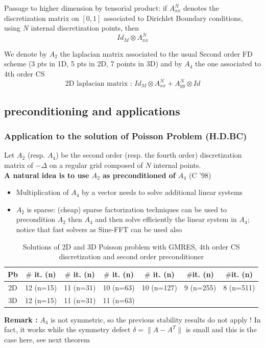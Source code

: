 \documentclass[hyperref={pdfpagemode=FullScreen},9pt]{beamer}
\begin{document}
\begin{frame}
Passage to higher dimension by tensorial product: if $A^N_{xx}$ denotes the discretization matrix on $[0,1]$ associated to Dirichlet Boundary conditions, using $N$ internal discretization points, then 
$$
Id_M\otimes A^N_{xx}
$$

We denote by $A_2$ the laplacian matrix associated to the usual Second order FD scheme (3 pts in 1D, 5 pts in 2D, 7 points in 3D) and by $A_4$ the one associated to 4th order CS
$$
\mbox{2D laplacian matrix : } Id_M\otimes A^N_{xx} + A^N_{yy}\otimes Id
$$
\end{frame}
  \subsection{preconditioning and applications}
 \begin{frame}
 \frametitle{Application to the solution of Poisson Problem  (H.D.BC)}
 Let $A_2$ (resp. $A_4$) be the second order (resp. the fourth order) discretization matrix  of $-\Delta$ on a regular grid composed of $N$ internal points.\\
{\bf A natural idea is to use $A_2$ as preconditioned of $A_4$} (C '98)
\begin{itemize}
\item Multiplication of $A_4$ by a vector needs to solve additional  linear systems
\item $A_2$ is sparse: (cheap) sparse factorization techniques can be used to precondition $A_2$ then $A_4$
and then solve efficiently the linear system in $A_4$;  notice that fast solvers as Sine-FFT can be used also
\end{itemize}
{\small 
\begin{table}[!h]
\begin{center}
\begin{tabular}{|c||c|c|c|c|c|c|}
\hline 
 Pb& $\#$ it. (n) &  $\#$ it. (n) & $\#$ it. (n) & $\#$ it. (n) & $\#$it. (n) & $\#$it. (n)  \\
 \hline
2D & 12 (n=15) &  11  (n=31) &  10 (n=63)  & 10 (n=127) & 9 (n=255) & 8 (n=511)\\
 \hline
 3D & 12 (n=15) &  11  (n=31) &  11 (n=63) & & &\\
\hline 
\end{tabular} 
\caption{Solutions of 2D and 3D Poisson problem with GMRES, 4th order CS discretization and second order preconditioner}
\label{PrecondPoisson}
\end{center}
\end{table}
}
{\bf Remark :} $A_4$ is not symmetric, so the previous stability results do not apply ! 
\pause
In fact, it works while the symmetry defect $\delta = \|A-A^T\|$ is small and this is the case here, see next theorem
 \end{frame}
\end{document}
